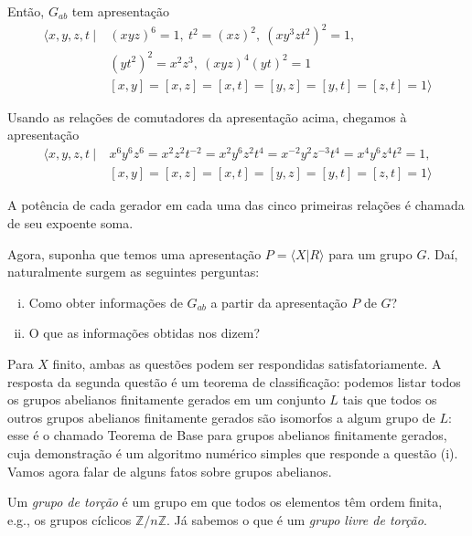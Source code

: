 \documentclass[a4paper,portuguese,11pt,twoside, leqno]{book}
\theoremstyle{definition}
\begin{document}
	\par\vspace{0.3cm} Então, $G_{ab}$ tem apresentação
	\begin{align*}
	\langle x,y,z,t \ | \ &(xyz)^6 = 1, \ t^2 = (xz)^2, \ (xy^3zt^2)^2 = 1, \\ 
	&(yt^2)^2 = x^2z^3, \ (xyz)^4(yt)^2 = 1 \\ 
	&[x,y] = [x,z] = [x,t] = [y,z] = [y,t] = [z,t] = 1\rangle
	\end{align*}
	\par\vspace{0.3cm} Usando as relações de comutadores da apresentação acima, chegamos à apresentação
	\begin{align*}
	\langle x,y,z,t \ | \ &x^6y^6z^6 = x^2z^2t^{-2} = x^2y^6z^2t^4 = x^{-2}y^2z^{-3}t^4 = x^4y^6z^4t^2 = 1, \\
	&[x,y] = [x,z] = [x,t] = [y,z] = [y,t] = [z,t] = 1
	\rangle
	\end{align*}
	\par\vspace{0.3cm} A potência de cada gerador em cada uma das cinco primeiras relações é chamada de seu expoente soma.
	\par\vspace{0.3cm} Agora, suponha que temos uma apresentação $P = \langle X|R \rangle$ para um grupo $G$. Daí, naturalmente surgem as seguintes perguntas:
	\begin{enumerate}[(i)]
		\item Como obter informações de $G_{ab}$ a partir da apresentação $P$ de $G$?
		\item O que as informações obtidas nos dizem? 
	\end{enumerate}
	\par\vspace{0.3cm} Para $X$ finito, ambas as questões podem ser respondidas satisfatoriamente. A resposta da segunda questão é um teorema de classificação: podemos listar todos os grupos abelianos finitamente gerados em um conjunto $L$ tais que todos os outros grupos abelianos finitamente gerados são isomorfos a algum grupo de $L$: esse é o chamado Teorema de Base para grupos abelianos finitamente gerados, cuja demonstração é um algoritmo numérico simples que responde a questão (i). Vamos agora falar de alguns fatos sobre grupos abelianos.
	\par\vspace{0.3cm} Um \textit{grupo de torção} é um grupo em que todos os elementos têm ordem finita, e.g., os grupos cíclicos $\mathbb{Z}/n\mathbb{Z}$. Já sabemos o que é um \textit{grupo livre de torção}.
\end{document}
